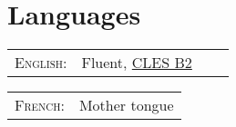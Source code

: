 \documentclass[a4paper,10pt]{article} %
\begin{document}
\begin{tabular}{r|p{11cm}}





\end{tabular}






\section{Languages}

\begin{tabular}{rlrl}
\textsc{English:}   & Fluent, \href{http://www.certification-cles.fr}{CLES B2}\\
\end{tabular}
\hfill
\begin{tabular}{rl}
\textsc{French:}    & Mother tongue\\
\end{tabular}
\end{document}
